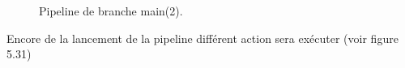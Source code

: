 {\begin{figure}[H]
\begin{center}
    \end{center}
    \caption{Pipeline de branche main(2).}
   \end{figure}
   \indent\indent Encore de la lancement de la pipeline différent action sera exécuter (voir figure 5.31)
   \begin{figure}[H]
       \begin{center}

\end{center}
\end{figure}}
